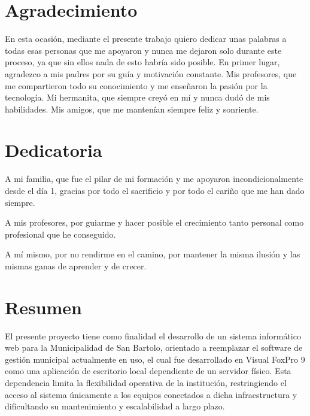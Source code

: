 \documentclass[12pt,a4paper]{report}
\begin{document}


\chapter*{Agradecimiento}

\hspace{1.25cm}En esta ocasión, mediante el presente trabajo quiero dedicar unas palabras a todas esas personas que me apoyaron y nunca me dejaron solo durante este proceso, ya que sin ellos nada de esto habría sido posible.
En primer lugar, agradezco a mis padres por su guía y motivación constante. Mis profesores, que me compartieron todo su conocimiento y me enseñaron la pasión por la tecnología. Mi hermanita, que siempre creyó en mí y nunca dudó de mis habilidades. Mis amigos, que me mantenían siempre feliz y sonriente.

\clearpage

\chapter*{Dedicatoria}

\hspace{1.25cm}A mi familia, que fue el pilar de mi formación y me apoyaron incondicionalmente desde el día 1, gracias por todo el sacrificio y por todo el cariño que me han dado siempre.

A mis profesores, por guiarme y hacer posible el crecimiento tanto personal como profesional que he conseguido.

A mí mismo, por no rendirme en el camino, por mantener la misma ilusión y las mismas ganas de aprender y de crecer.

\clearpage

\chapter*{Resumen}

El presente proyecto tiene como finalidad el desarrollo de un sistema informático web para la Municipalidad de San Bartolo, orientado a reemplazar el software de gestión municipal actualmente en uso, el cual fue desarrollado en Visual FoxPro 9 como una aplicación de escritorio local dependiente de un servidor físico. Esta dependencia limita la flexibilidad operativa de la institución, restringiendo el acceso al sistema únicamente a los equipos conectados a dicha infraestructura y dificultando su mantenimiento y escalabilidad a largo plazo.
\end{document}
